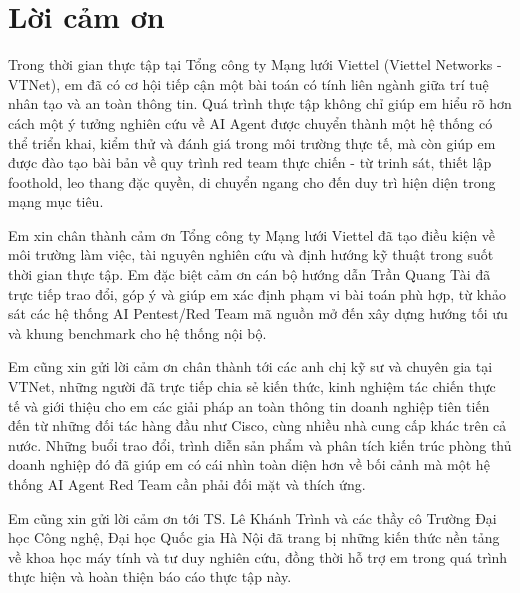 \newpage
\section*{\centering Lời cảm ơn}

Trong thời gian thực tập tại Tổng công ty Mạng lưới Viettel (Viettel Networks - VTNet), em đã có cơ hội tiếp cận một bài toán có tính liên ngành giữa trí tuệ nhân tạo và an toàn thông tin. Quá trình thực tập không chỉ giúp em hiểu rõ hơn cách một ý tưởng nghiên cứu về AI Agent được chuyển thành một hệ thống có thể triển khai, kiểm thử và đánh giá trong môi trường thực tế, mà còn giúp em được đào tạo bài bản về quy trình red team thực chiến - từ trinh sát, thiết lập foothold, leo thang đặc quyền, di chuyển ngang cho đến duy trì hiện diện trong mạng mục tiêu.

Em xin chân thành cảm ơn Tổng công ty Mạng lưới Viettel đã tạo điều kiện về môi trường làm việc, tài nguyên nghiên cứu và định hướng kỹ thuật trong suốt thời gian thực tập. Em đặc biệt cảm ơn cán bộ hướng dẫn Trần Quang Tài đã trực tiếp trao đổi, góp ý và giúp em xác định phạm vi bài toán phù hợp, từ khảo sát các hệ thống AI Pentest/Red Team mã nguồn mở đến xây dựng hướng tối ưu và khung benchmark cho hệ thống nội bộ.

Em cũng xin gửi lời cảm ơn chân thành tới các anh chị kỹ sư và chuyên gia tại VTNet, những người đã trực tiếp chia sẻ kiến thức, kinh nghiệm tác chiến thực tế và giới thiệu cho em các giải pháp an toàn thông tin doanh nghiệp tiên tiến đến từ những đối tác hàng đầu như Cisco, cùng nhiều nhà cung cấp khác trên cả nước. Những buổi trao đổi, trình diễn sản phẩm và phân tích kiến trúc phòng thủ doanh nghiệp đó đã giúp em có cái nhìn toàn diện hơn về bối cảnh mà một hệ thống AI Agent Red Team cần phải đối mặt và thích ứng.

Em cũng xin gửi lời cảm ơn tới TS. Lê Khánh Trình và các thầy cô Trường Đại học Công nghệ, Đại học Quốc gia Hà Nội đã trang bị những kiến thức nền tảng về khoa học máy tính và tư duy nghiên cứu, đồng thời hỗ trợ em trong quá trình thực hiện và hoàn thiện báo cáo thực tập này.

\newpage
